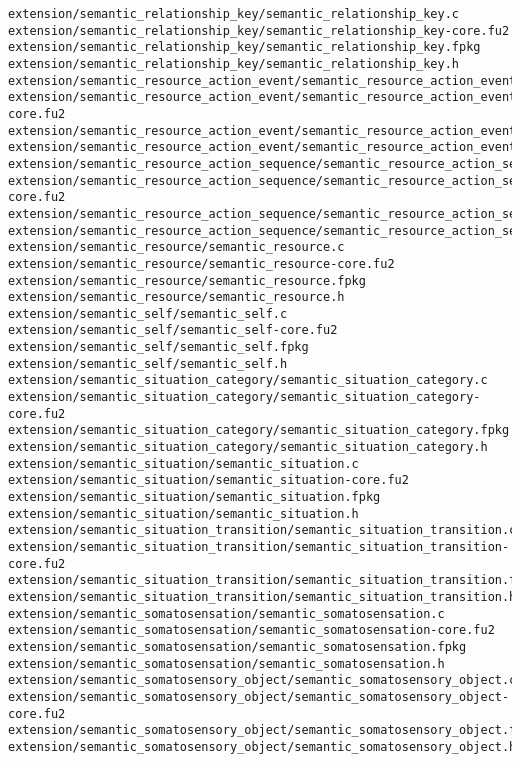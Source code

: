 \begin{lstlisting}
extension/semantic_relationship_key/semantic_relationship_key.c
extension/semantic_relationship_key/semantic_relationship_key-core.fu2
extension/semantic_relationship_key/semantic_relationship_key.fpkg
extension/semantic_relationship_key/semantic_relationship_key.h
extension/semantic_resource_action_event/semantic_resource_action_event.c
extension/semantic_resource_action_event/semantic_resource_action_event-core.fu2
extension/semantic_resource_action_event/semantic_resource_action_event.fpkg
extension/semantic_resource_action_event/semantic_resource_action_event.h
extension/semantic_resource_action_sequence/semantic_resource_action_sequence.c
extension/semantic_resource_action_sequence/semantic_resource_action_sequence-core.fu2
extension/semantic_resource_action_sequence/semantic_resource_action_sequence.fpkg
extension/semantic_resource_action_sequence/semantic_resource_action_sequence.h
extension/semantic_resource/semantic_resource.c
extension/semantic_resource/semantic_resource-core.fu2
extension/semantic_resource/semantic_resource.fpkg
extension/semantic_resource/semantic_resource.h
extension/semantic_self/semantic_self.c
extension/semantic_self/semantic_self-core.fu2
extension/semantic_self/semantic_self.fpkg
extension/semantic_self/semantic_self.h
extension/semantic_situation_category/semantic_situation_category.c
extension/semantic_situation_category/semantic_situation_category-core.fu2
extension/semantic_situation_category/semantic_situation_category.fpkg
extension/semantic_situation_category/semantic_situation_category.h
extension/semantic_situation/semantic_situation.c
extension/semantic_situation/semantic_situation-core.fu2
extension/semantic_situation/semantic_situation.fpkg
extension/semantic_situation/semantic_situation.h
extension/semantic_situation_transition/semantic_situation_transition.c
extension/semantic_situation_transition/semantic_situation_transition-core.fu2
extension/semantic_situation_transition/semantic_situation_transition.fpkg
extension/semantic_situation_transition/semantic_situation_transition.h
extension/semantic_somatosensation/semantic_somatosensation.c
extension/semantic_somatosensation/semantic_somatosensation-core.fu2
extension/semantic_somatosensation/semantic_somatosensation.fpkg
extension/semantic_somatosensation/semantic_somatosensation.h
extension/semantic_somatosensory_object/semantic_somatosensory_object.c
extension/semantic_somatosensory_object/semantic_somatosensory_object-core.fu2
extension/semantic_somatosensory_object/semantic_somatosensory_object.fpkg
extension/semantic_somatosensory_object/semantic_somatosensory_object.h

\end{lstlisting}
